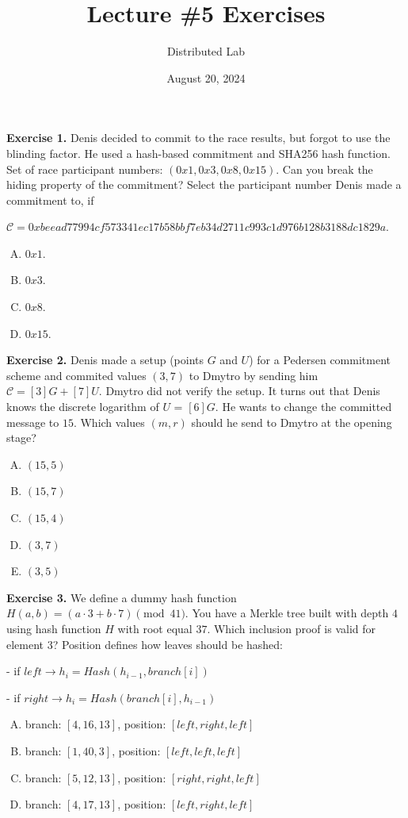\documentclass{zkdl-tests-template}
\title{\huge\sffamily\bfseries Lecture \#5 Exercises}
\author{\Large\sffamily Distributed Lab}
\date{\sffamily August 20, 2024}
\begin{document}
\pagestyle{fancy}

\maketitle

\textbf{Exercise 1.} Denis decided to commit to the race results, but forgot to use the blinding factor.  
    He used a hash-based commitment and SHA256 hash function. 
    Set of race participant numbers: $(0x1, 0x3, 0x8, 0x15)$. Can you break the hiding property of the commitment? Select the participant number 
    Denis made a commitment to, if 
    
    $\mathcal{C} = 0xbeead77994cf573341ec17b58bbf7eb34d2711c993c1d976b128b3188dc1829a$.
\begin{enumerate}[(A)]
    \item $0x1$.
    \item $0x3$.
    \item $0x8$.
    \item $0x15$.
\end{enumerate}

\textbf{Exercise 2.} Denis made a setup (points $G$ and $U$) for a Pedersen commitment scheme and commited values $(3, 7)$ to Dmytro
by sending him $\mathcal{C} = [3]G + [7]U$. Dmytro did not verify the setup. It turns out that Denis knows the discrete logarithm of $U$ = $[6]G$. 
He wants to change the committed message
to $15$. Which values $(m, r)$ should he send to Dmytro at the opening stage?
\begin{enumerate}[(A)]
    \item $(15, 5)$
    \item $(15, 7)$
    \item $(15, 4)$
    \item $(3, 7)$
    \item $(3, 5)$
\end{enumerate}

\textbf{Exercise 3.} We define a dummy hash function $H(a, b) = (a \cdot 3 + b \cdot 7) \pmod{41}$. You have a Merkle tree built with depth $4$ 
using hash function $H$ with root equal $37$. Which inclusion proof is valid for element $3$?
Position defines how leaves should be hashed:

    - if $left \rightarrow h_i = Hash(h_{i-1}, branch[i])$

    - if $right \rightarrow  h_i = Hash(branch[i], h_{i-1})$

\begin{enumerate}[(A)]
    \item branch: $[4, 16, 13]$, position: $[left, right, left]$
    \item branch: $[1, 40, 3]$, position: $[left, left, left]$
    \item branch: $[5, 12, 13]$, position: $[right, right, left]$
    \item branch: $[4, 17, 13]$, position: $[left, right, left]$
\end{enumerate}
\end{document}
